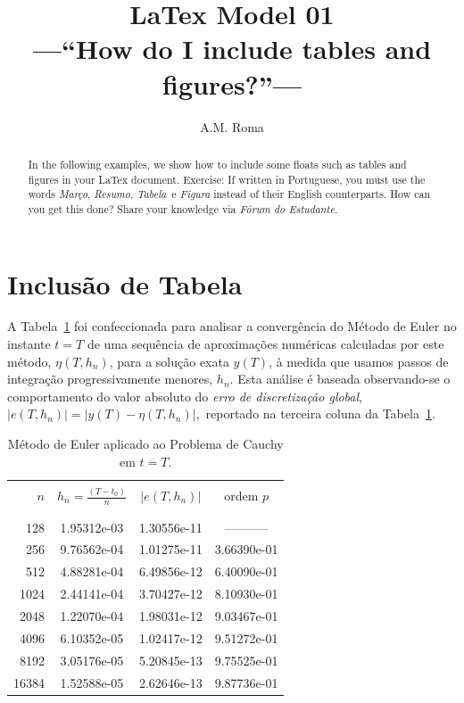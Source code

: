 \documentclass[a4paper,10pt]{article}
\title{LaTex Model 01\\---``How do I include tables and figures?''---}
\author{A.M. Roma}
\begin{document}
\maketitle

\begin{abstract} In the following examples, we show how to include some floats such as tables and figures in your LaTex document. Exercise: If written in Portuguese, you must use the words {\it Março}, {\it Resumo}, {\it Tabela}\, e {\it Figura} instead of their English counterparts. How can you get this done? Share your knowledge via {\it Fórum do Estudante}.\end{abstract}

\section{Inclusão de Tabela}
A Tabela~\ref{tabmodel-1} foi confeccionada para analisar a convergência do Método de Euler no instante $t=T$ 
de uma sequência de aproximações numéricas calculadas por este método, $\eta(T,h_n)$, para a solução exata $y(T)$, à medida que usa\-mos passos de integração progressivamente menores, $h_n$. Esta análise é baseada  observando-se o comportamento do valor absoluto do {\it erro de discretização global}, 
$\left|e(T, h_n)\right|=\left|y(T)-\eta(T,h_n)\right|,$ reportado na terceira coluna da Tabela~\ref{tabmodel-1}.

\begin{table}[!ht]
\centering
\begin{tabular}{rccc}\hline\hline\\
 $n$ &$h_n=\displaystyle \frac{(T-t_0)}{n}$ & $\left|e(T, h_n)\right|$  & ordem $p$\\\\
	\hline\hline
	\\
  128 &  1.95312e-03 &  1.30556e-11 &  ----------- \\
  256 &  9.76562e-04 &  1.01275e-11 &  3.66390e-01 \\
  512 &  4.88281e-04 &  6.49856e-12 &  6.40090e-01 \\
 1024 &  2.44141e-04 &  3.70427e-12 &  8.10930e-01 \\
 2048 &  1.22070e-04 &  1.98031e-12 &  9.03467e-01 \\
 4096 &  6.10352e-05 &  1.02417e-12 &  9.51272e-01 \\
 8192 &  3.05176e-05 &  5.20845e-13 &  9.75525e-01 \\
16384 &  1.52588e-05 &  2.62646e-13 &  9.87736e-01 \\
		\hline\hline
\end{tabular}
\caption{Método de Euler aplicado ao Problema de Cauchy em $t=T$. 
}
\label{tabmodel-1}
\end{table}
\end{document}
